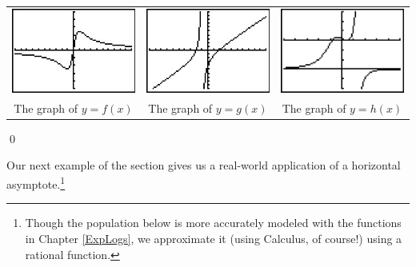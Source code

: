 \begin{ex}
\begin{enumerate}
\begin{center}
\begin{tabular}{ccc}

\includegraphics[width=1.75in]{./RationalsGraphics/Rationals06.jpg}  & \includegraphics[width=1.75in]{./RationalsGraphics/Rationals07.jpg} & \includegraphics[width=1.75in]{./RationalsGraphics/Rationals08.jpg} \\

The graph of $y=f(x)$  & The graph of $y=g(x)$ & The graph of $y=h(x)$ \\


\end{tabular}
\end{center} 

\end{enumerate}

\vspace{-.25in} \qed

\end{ex}

Our next example of the section gives us a real-world application of a horizontal asymptote.\footnote{Though the population below is more accurately modeled with the functions in Chapter \ref{ExpLogs}, we approximate it (using Calculus, of course!) using a rational function.}

